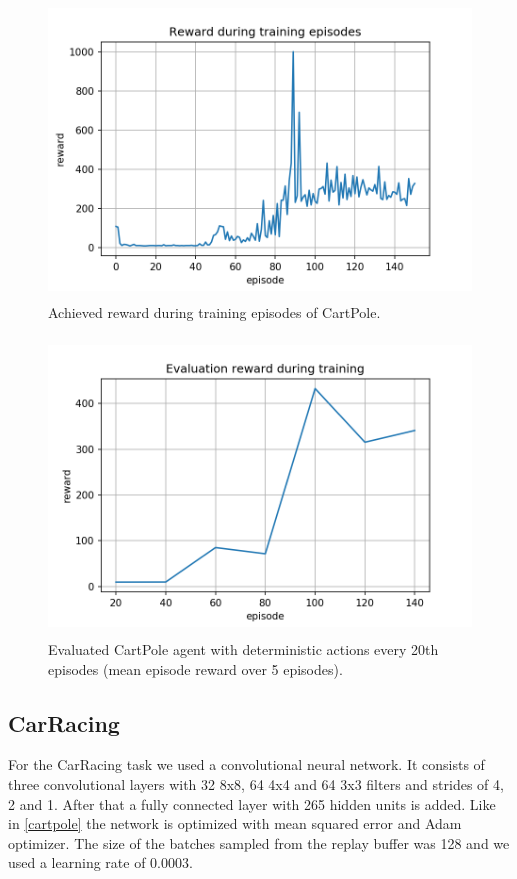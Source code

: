 \documentclass[a4paper,12pt]{article}
\begin{document}
\begin{figure}[H]
	\centering \includegraphics[width=11.70cm, height=7.9cm]{plots/cartpole_episode_reward.png}
	\caption{
		\label{fig:cartpole_episode_reward}
		Achieved reward during training episodes of CartPole.
	}
\end{figure}

\begin{figure}[H]
	\centering \includegraphics[width=11.70cm, height=7.9cm]{plots/cartpole_evaluation_reward.png}
	\caption{
		\label{fig:cartpole_evaluation_reward}
		Evaluated CartPole agent with deterministic actions every 20th episodes (mean episode reward over 5 episodes).
	}
\end{figure}

\subsection{CarRacing}\label{carracing}

For the CarRacing task we used a convolutional neural network. It consists of three convolutional layers with 32 8x8, 64 4x4 and 64 3x3 filters and strides of 4, 2 and 1. After that a fully connected layer with 265 hidden units is added. Like in \autoref{cartpole} the network is optimized with mean squared error and Adam optimizer. The size of the batches sampled from the replay buffer was 128 and we used a learning rate of 0.0003. \\
\end{document}
